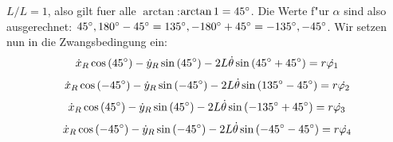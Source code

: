 \documentclass[11pt]{article}
\begin{document}
    $L/L = 1$, also gilt fuer alle $\arctan$:\space$\arctan1 = 45\degree$.
    Die Werte f"ur $\alpha$ sind also ausgerechnet: $45\degree, 180\degree-45\degree = 135\degree, -180\degree+45 \degree = -135\degree, -45\degree$.
    Wir setzen nun in die Zwangsbedingung ein:
    \begin{equation}
        \dot{x}_{R}\cos\left(45\degree \right) - \dot{y}_{R}\sin\left(45\degree \right) - 2L\dot{\theta}\sin\left( 45\degree + 45\degree \right) = r\dot{\varphi_{1}}\label{eq:einsetzen1}
    \end{equation}
    \begin{equation}
        \dot{x}_{R}\cos\left(-45\degree \right) - \dot{y}_{R}\sin\left(-45\degree \right) - 2L\dot{\theta}\sin\left( 135\degree -45\degree \right) = r\dot{\varphi_{2}}\label{eq:einsetzen2}
    \end{equation}
    \begin{equation}
        \dot{x}_{R}\cos\left(45\degree \right) - \dot{y}_{R}\sin\left(45\degree \right) - 2L\dot{\theta}\sin\left( -135\degree + 45\degree \right) = r\dot{\varphi_{3}}\label{eq:einsetzen3}
    \end{equation}
    \begin{equation}
        \dot{x}_{R}\cos\left(-45\degree \right) - \dot{y}_{R}\sin\left(-45\degree \right) - 2L\dot{\theta}\sin\left( -45\degree - 45\degree \right) = r\dot{\varphi_{4}}\label{eq:einsetzen4}
    \end{equation}
\end{document}
